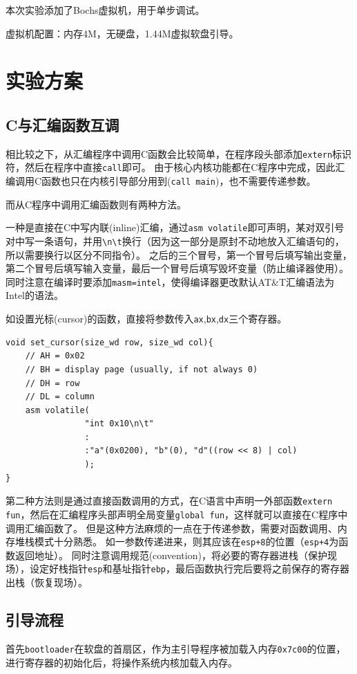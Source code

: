 \documentclass[logo,reportComp]{thesis}
\begin{document}
本次实验添加了Bochs虚拟机，用于单步调试。

虚拟机配置：内存4M，无硬盘，1.44M虚拟软盘引导。

\section{实验方案}
\subsection{C与汇编函数互调}
相比较之下，从汇编程序中调用C函数会比较简单，在程序段头部添加\verb'extern'标识符，然后在程序中直接\verb'call'即可。
由于核心内核功能都在C程序中完成，因此汇编调用C函数也只在内核引导部分用到(\verb'call main')，也不需要传递参数。

而从C程序中调用汇编函数则有两种方法。

一种是直接在C中写内联(inline)汇编，通过\verb'asm volatile'即可声明，某对双引号对中写一条语句，并用\verb'\n\t'换行（因为这一部分是原封不动地放入汇编语句的，所以需要换行以区分不同指令）。
之后的三个冒号，第一个冒号后填写输出变量，第二个冒号后填写输入变量，最后一个冒号后填写毁坏变量（防止编译器使用）。
同时注意在编译时要添加\verb'masm=intel'，使得编译器更改默认AT\&T汇编语法为Intel的语法。

如设置光标(cursor)的函数，直接将参数传入\verb'ax',\verb'bx',\verb'dx'三个寄存器。
\begin{lstlisting}
void set_cursor(size_wd row, size_wd col){
    // AH = 0x02
    // BH = display page (usually, if not always 0)
    // DH = row
    // DL = column
    asm volatile(
                "int 0x10\n\t"
                :
                :"a"(0x0200), "b"(0), "d"((row << 8) | col)
                );
}
\end{lstlisting}

第二种方法则是通过直接函数调用的方式，在C语言中声明一外部函数\verb'extern fun'，然后在汇编程序头部声明全局变量\verb'global fun'，这样就可以直接在C程序中调用汇编函数了。
但是这种方法麻烦的一点在于传递参数，需要对函数调用、内存堆栈模式十分熟悉。
如一参数传递进来，则其应该在\verb'esp+8'的位置（\verb'esp+4'为函数返回地址）。
同时注意调用规范(convention)，将必要的寄存器进栈（保护现场），设定好栈指针\verb'esp'和基址指针\verb'ebp'，最后函数执行完后要将之前保存的寄存器出栈（恢复现场）。

\subsection{引导流程}
首先\verb'bootloader'在软盘的首扇区，作为主引导程序被加载入内存\verb'0x7c00'的位置，进行寄存器的初始化后，将操作系统内核加载入内存。
\end{document}
